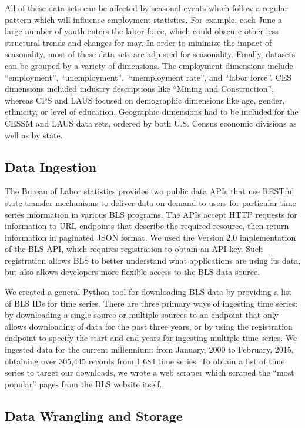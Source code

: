 \documentclass{sigchi}
\begin{document}
{All of these data sets can be affected by seasonal events which follow a regular pattern which will influence employment statistics. For example, each June a large number of youth enters the labor force, which could obscure other less structural trends and changes for may. In order to minimize the impact of seasonality, most of these data sets are adjusted for seasonality. Finally, datasets can be grouped by a variety of dimensions. The employment dimensions include ``employment'', ``unemployment'', ``unemployment rate'', and ``labor force''. CES dimensions included industry descriptions like ``Mining and Construction'', whereas CPS and LAUS focused on demographic dimensions like age, gender, ethnicity, or level of education. Geographic dimensions had to be included for the CESSM and LAUS data sets, ordered by both U.S. Census economic divisions as well as by state.

\subsection{Data Ingestion}

The Bureau of Labor statistics provides two public data APIs that use RESTful state transfer mechanisms to deliver data on demand to users for particular time series information in various BLS programs. The APIs accept HTTP requests for information to URL endpoints that describe the required resource, then return information in paginated JSON format. We used the Version 2.0 implementation of the BLS API, which requires registration to obtain an API key. Such registration allows BLS to better understand what applications are using its data, but also allows developers more flexible access to the BLS data source.

We created a general Python tool for downloading BLS data by providing a list of BLS IDs for time series. There are three primary ways of ingesting time series: by downloading a single source or multiple sources to an endpoint that only allows downloading of data for the past three years, or by using the registration endpoint to specify the start and end years for ingesting multiple time series. We ingested data for the current millennium: from January, 2000 to February, 2015, obtaining over 305,445 records from 1,684 time series. To obtain a list of time series to target our downloads, we wrote a web scraper which scraped the ``most popular'' pages from the BLS website itself.

\subsection{Data Wrangling and Storage}

}
\end{document}
